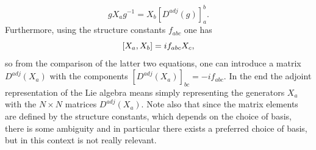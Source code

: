 \begin{equation}
    gX_ag^{-1} = X_b[D^{adj}(g)]^b_a.
\end{equation}
Furthermore, using the structure constants $f_{abc}$ one has
\begin{equation}
  [X_a,X_b] = if_{abc}X_c,
\end{equation}
so from the comparison of the latter two equations, one can introduce a matrix $D^{adj}(X_a)$ with the components $[D^{adj}(X_a)]_{bc} = -if_{abc}$. In the end the adjoint representation of the Lie algebra means simply representing the generators $X_a$ with the $N \times N$ matrices $D^{adj}(X_a)$. Note also that since the matrix elements are defined by the structure constants, which depends on the choice of basis, there is some ambiguity and in particular there exists a preferred choice of basis, but in this context is not really relevant.


